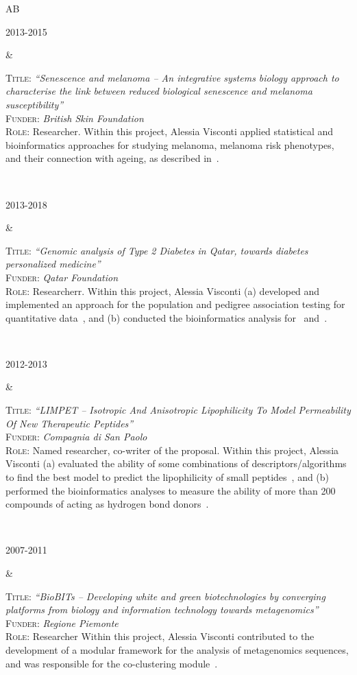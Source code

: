 \documentclass[a4paper,10pt]{article}
\newenvironment{doubletablelist}
{
	\vspace{-0.2cm}
	\begin{longtable}[!h]{AB}}{\end{longtable}
}
\newcommand{\dtlist}[2]{
\hspace{-3cm}
\noindent
	\begin{minipage}{0.22\textwidth}
	\begin{flushright}
	\textsc{#1}
	\end{flushright}
	\end{minipage}
	& #2\\[0.2cm]
}
\begin{document}
\begin{doubletablelist}
	\dtlist{2013-2015}{  \begin{minipage}[t]{0.65\textwidth}
		\textsc{Title:} \emph{``Senescence and melanoma -- An integrative systems biology approach to characterise the link between reduced biological senescence and melanoma susceptibility''}\\
		\textsc{Funder:} \emph{British Skin Foundation}\\
		\textsc{Role:} Researcher. Within this project, Alessia Visconti applied statistical and bioinformatics approaches for studying melanoma, melanoma risk phenotypes, and their connection with ageing, as described in~\cite{Rib16,Hys18,Vis18a,Duf17,Vis19a,Vis20,San20}.
	\end{minipage}}
		
	\dtlist{2013-2018}{  \begin{minipage}[t]{0.65\textwidth}
		\textsc{Title:} \emph{``Genomic analysis of Type 2 Diabetes in Qatar, towards diabetes personalized medicine''}\\
		\textsc{Funder:} \emph{Qatar Foundation}\\
		\textsc{Role:} Researcherr. Within this project, Alessia Visconti (a) developed and implemented an approach for the population and pedigree association testing for quantitative data~\cite{Vis16}, and (b) conducted the bioinformatics analysis for~\cite{AlM15} and~\cite{Zag18}.
	\end{minipage}}
	
	\dtlist{2012-2013}{  \begin{minipage}[t]{0.65\textwidth}
		\textsc{Title:} \emph{``LIMPET -- Isotropic And Anisotropic Lipophilicity To Model Permeability Of New Therapeutic Peptides''}\\
		\textsc{Funder:} \emph{Compagnia di San Paolo}\\
		\textsc{Role:} Named researcher, co-writer of the proposal. Within this project, Alessia Visconti (a) evaluated the ability of some combinations of descriptors/algorithms to find the best model to predict the lipophilicity of small peptides~\cite{Vis15a}, and (b) performed the bioinformatics analyses to measure the ability of more than 200 compounds of acting as hydrogen bond donors~\cite{Erm14}.
	\end{minipage}}	

	\dtlist{2007-2011}{   \begin{minipage}[t]{0.65\textwidth}
		\textsc{Title:} \emph{``BioBITs -- Developing white and green biotechnologies by converging platforms from biology and information technology towards metagenomics''}\\
		\textsc{Funder:} \emph{Regione Piemonte}\\
		\textsc{Role:} Researcher Within this project, Alessia Visconti contributed to the development of a modular framework for the analysis of metagenomics sequences, and was responsible for the co-clustering module~\cite{Bon11}. 
	\end{minipage}}
	

\end{doubletablelist}
\end{document}
